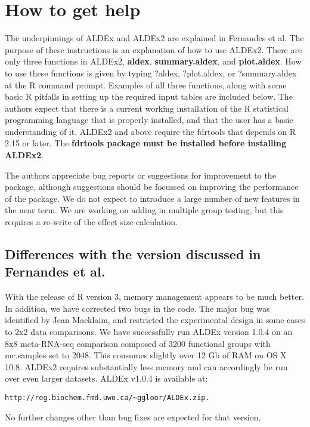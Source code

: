 \documentclass[11pt]{amsart}
\begin{document}
\section{How to get help}
The underpinnings of ALDEx and ALDEx2 are explained in Fernandes et al\cite{fernandes:2013}. The purpose of these instructions is an explanation of how to use ALDEx2. There are only three functions in ALDEx2, {\bf aldex}, {\bf summary.aldex}, and {\bf plot.aldex}. How to use these functions is given by typing ?aldex, ?plot.aldex, or ?summary.aldex at the R command prompt. Examples of all three functions, along with some basic R pitfalls in setting up the required input tables are included below. The authors expect that there is a current working installation of the R statistical programming language that is properly installed, and that the user has a basic understanding of it. ALDEx2 and above require the fdrtools that depends on R 2.15 or later. The \textbf{fdrtools package must be installed before installing ALDEx2}.

The authors appreciate bug reports or suggestions for improvement to the package, although suggestions should be focussed on improving the performance of the package. We do not expect to introduce a large number of new features in the near term. We are working on adding in multiple group testing, but this requires a re-write of the effect size calculation.

\subsection{Differences with the version discussed in Fernandes et al.\cite{fernandes:2013}}  With the release of R version 3, memory management appears to be much better. In addition, we have corrected two bugs in the code. The major bug was identified by Jean Macklaim, and restricted the experimental design in some cases to 2x2 data comparisons. We have successfully run ALDEx version 1.0.4 on an 8x8 meta-RNA-seq comparison composed of 3200 functional groups with mc.samples set to 2048. This consumes slightly over 12 Gb of RAM on OS X 10.8. ALDEx2  requires substantially less memory and can accordingly be run over even larger datasets. ALDEx v1.0.4 is available at: \begin{verbatim}http://reg.biochem.fmd.uwo.ca/~ggloor/ALDEx.zip.\end{verbatim} No further changes other than bug fixes are expected for that version. 
\end{document}
